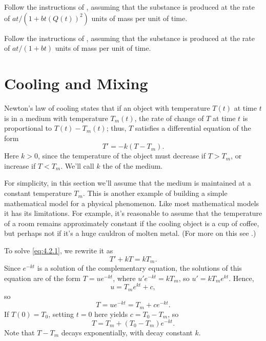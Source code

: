\begin{exerciselist}
\item\label{exer:4.1.26}\Lex
Follow the instructions of , assuming that
the substance is produced at the rate of   $at/(1+bt(Q(t))^2)$
units of mass per unit of time.


\item\label{exer:4.1.27}\Lex
Follow the instructions of , assuming that
the substance is produced at the rate of   $at/(1+bt)$
units of mass per unit of time.


\end{exerciselist}


\section{Cooling and Mixing}\label{sec:cooling_mixing}


Newton's law of cooling states that if an object with temperature
$T(t)$ at time $t$ is in a medium with temperature $T_m(t)$,  the
rate of change of $T$ at time $t$ is proportional to $T(t)-T_m(t)$;
thus,
$T$ satisfies a differential equation of the form
\begin{equation} \label{eq:4.2.1}
T'=-k(T-T_m).
\end{equation}
 Here $k > 0$, since the temperature of the object must decrease if
$T > T_m$, or increase if $T < T_m$.
We'll call $k$  the  of the medium.

For simplicity, in this section we'll assume  that the medium is
maintained at a constant temperature $T_m$. This is another example of
 building a simple mathematical model for a physical
phenomenon.
Like most mathematical models it has its limitations. For
example, it's reasonable to assume that the temperature of a room
remains approximately constant if the cooling object is a cup of
coffee, but perhaps not if it's a huge cauldron of molten metal. (For
more on this see .)


To solve  \eqref{eq:4.2.1}, we rewrite it as
\[
T'+kT=kT_m.
\]
Since $e^{-kt}$ is a solution of the complementary equation, the
solutions of this equation are of the form $T=ue^{-kt}$, where
$u'e^{-kt}=kT_m$, so $u'=kT_me^{kt}$. Hence,
\[
u=T_me^{kt}+c,
\]
so
\[
T=ue^{-kt}=T_m+ce^{-kt}.
\]
If $T(0)=T_0$,  setting $t=0$ here yields $c=T_0-T_m$, so
\begin{equation} \label{eq:4.2.2}
T=T_m+(T_0-T_m)e^{-kt}.
\end{equation}
Note that $T-T_m$ decays exponentially, with decay constant $k$.


